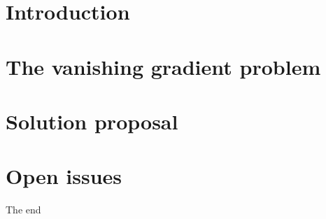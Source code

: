\documentclass[xcolor=dvipsnames,10pt]{beamer}
\title[Recurrent neural network]{}
\author{Giulio Galvan}
\date{\today}
\begin{document}
\frame{\titlepage}
\section{Introduction}

\section{The vanishing gradient problem}

\section{Solution proposal}

\section{Open issues}


\begin{frame}
   \begin{center}
    \begin{beamerboxesrounded}[lower=lowercolor, shadow=true]{}
     \begin{center}
    \normalsize{The end}
     \end{center}
    \end{beamerboxesrounded}
  \end{center}
\end{frame} 
\end{document}
